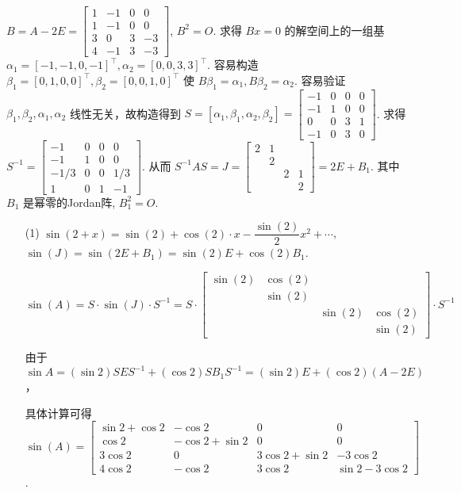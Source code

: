 \documentclass{article}
\begin{document}
\begin{spacing}{1.5}
\begin{enumerate}
    $B = A - 2E = \left[\begin{array}{cccc}1&-1&0&0\\1&-1&0&0\\3&0&3&-3\\4&-1&3&-3\end{array}\right]$, $B^2 = O$. 求得 $Bx=0$ 的解空间上的一组基 $\alpha_1 = [-1, -1, 0, -1]^\top, \alpha_2=[0, 0, 3, 3]^\top$. 容易构造 $\beta_1 = [0, 1, 0, 0]^\top, \beta_2 = [0, 0, 1, 0]^\top$ 使 $B\beta_1 = \alpha_1, B\beta_2 = \alpha_2$. 容易验证 $\beta_1, \beta_2, \alpha_1, \alpha_2$ 线性无关，故构造得到 $S = [\alpha_1, \beta_1, \alpha_2, \beta_2] = \left[\begin{array}{cccc}-1&0&0&0\\-1&1&0&0\\0&0&3&1\\-1&0&3&0\end{array}\right]$. 求得 $S^{-1} = \left[\begin{array}{cccc}-1&0&0&0\\-1&1&0&0\\-1/3&0&0&1/3\\1&0&1&-1\end{array}\right]$. 从而 $S^{-1}AS = J = \left[\begin{array}{cccc}2&1&&\\&2&&\\&&2&1\\&&&2\end{array}\right] = 2E + B_1$. 其中 $B_1$ 是幂零的Jordan阵, $B_1^2=O$.

    \begin{itemize}
        \item [(1)] $\sin(2 + x) = \sin(2) + \cos(2) \cdot x - \dfrac{\sin(2)}{2}x^2 + \cdots$, $\sin(J) = \sin(2 E + B_1) = \sin(2)E + \cos(2) B_1$. 
        
        $\sin(A) = S \cdot \sin(J) \cdot S^{-1} = S \cdot \left[\begin{array}{cccc}\sin(2)&\cos(2)&&\\&\sin(2)&&\\&&\sin(2)&\cos(2)\\&&&\sin(2)\end{array}\right] \cdot S^{-1}$

        由于 $\sin A = (\sin 2) SES^{-1} + (\cos 2) SB_1S^{-1} = (\sin 2) E + (\cos 2) (A - 2E)$，

        具体计算可得 $\sin(A) = \left[\begin{array}{cccc}\sin 2 + \cos 2&-\cos 2&0&0\\\cos 2&-\cos 2 + \sin 2 & 0 & 0\\3\cos 2&0&3\cos 2 + \sin 2& -3\cos 2\\4\cos 2&-\cos 2&3\cos 2&\sin 2 - 3\cos 2\end{array}\right]$.


\end{itemize}
\end{enumerate}
\end{spacing}
\end{document}
